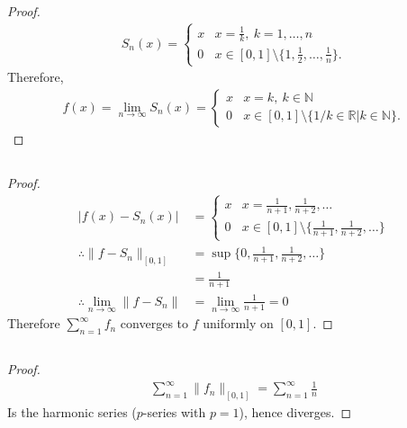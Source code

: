 \documentclass{article}
\theoremstyle{plain}
\newcommand{\R}{\mathbb{R}}
\newcommand{\N}{\mathbb{N}}
\begin{document}
\section{}
\subsection{}
\begin{proof}
\begin{align*}
S_{n}(x)=\begin{cases}
  x&x=\frac{1}{k},\ k=1,\ldots,n\\
  0&x\in[0,1]\setminus\{1,\frac{1}{2},\ldots,\frac{1}{n}\}.
\end{cases}
\end{align*}
Therefore,
\begin{align*}
f(x)=\lim_{n\to\infty}S_{n}(x)=\begin{cases}
  x&x=k,\ k\in\N\\
  0&x\in[0,1]\setminus\{1/k\in\R|k\in\N\}.
\end{cases}
\end{align*}
\end{proof}
\subsection{}
\begin{proof}
\begin{align*}
|f(x)-S_{n}(x)|&=\begin{cases}
  x&x=\frac{1}{n+1},\frac{1}{n+2},\ldots\\
  0&x\in[0,1]\setminus\{\frac{1}{n+1},\frac{1}{n+2},\ldots\}
\end{cases}\\
  \therefore\|f-S_{n}\|_{[0,1]}&=\sup\{0,\frac{1}{n+1},\frac{1}{n+2},\ldots\}\\
               &=\frac{1}{n+1}\\
  \therefore \lim_{n\to\infty}\|f-S_{n}\|&=\lim_{n\to\infty}\frac{1}{n+1}=0
\end{align*}
Therefore $\sum_{n=1}^{\infty}f_{n}$ converges to $f$ uniformly on $[0,1]$.
\end{proof}
\subsection{}
\begin{proof}
\begin{align*}
\sum^{\infty}_{n=1}\|f_{n}\|_{[0,1]}=\sum_{n=1}^{\infty}\frac{1}{n}
\end{align*}
Is the harmonic series ($p$-series with $p=1$), hence diverges.
\end{proof}
\end{document}
